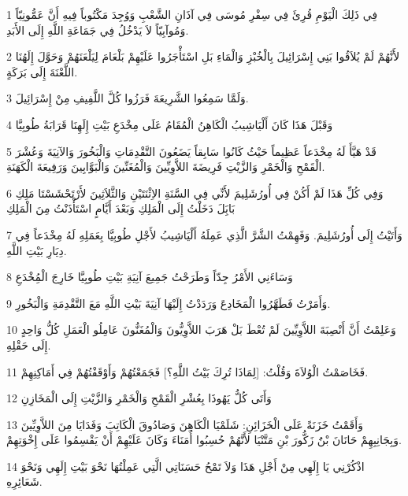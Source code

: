 \par 1 فِي ذَلِكَ الْيَوْمِ قُرِئَ فِي سِفْرِ مُوسَى فِي آذَانِ الشَّعْبِ وَوُجِدَ مَكْتُوباً فِيهِ أَنَّ عَمُّونِيّاً وَمُوآبِيّاً لاَ يَدْخُلُ فِي جَمَاعَةِ اللَّهِ إِلَى الأَبَدِ.
\par 2 لأَنَّهُمْ لَمْ يُلاَقُوا بَنِي إِسْرَائِيلَ بِالْخُبْزِ وَالْمَاءِ بَلِ اسْتَأْجَرُوا عَلَيْهِمْ بَلْعَامَ لِيَلْعَنَهُمْ وَحَوَّلَ إِلَهُنَا اللَّعْنَةَ إِلَى بَرَكَةٍ.
\par 3 وَلَمَّا سَمِعُوا الشَّرِيعَةَ فَرَزُوا كُلَّ اللَّفِيفِ مِنْ إِسْرَائِيلَ.
\par 4 وَقَبْلَ هَذَا كَانَ أَلْيَاشِيبُ الْكَاهِنُ الْمُقَامُ عَلَى مِخْدَعِ بَيْتِ إِلَهِنَا قَرَابَةُ طُوبِيَّا
\par 5 قَدْ هَيَّأَ لَهُ مِخْدَعاً عَظِيماً حَيْثُ كَانُوا سَابِقاً يَضَعُونَ التَّقْدِمَاتِ وَالْبَخُورَ وَالآنِيَةَ وَعُشْرَ الْقَمْحِ وَالْخَمْرِ وَالزَّيْتِ فَرِيضَةَ اللاَّوِيِّينَ وَالْمُغَنِّينَ وَالْبَوَّابِينَ وَرَفِيعَةَ الْكَهَنَةِ.
\par 6 وَفِي كُلِّ هَذَا لَمْ أَكُنْ فِي أُورُشَلِيمَ لأَنِّي فِي السَّنَةِ الاِثْنَتَيْنِ وَالثَّلاَثِينَ لأَرْتَحْشَسْتَا مَلِكِ بَابَِلَ دَخَلْتُ إِلَى الْمَلِكِ وَبَعْدَ أَيَّامٍ اسْتَأْذَنْتُ مِنَ الْمَلِكِ
\par 7 وَأَتَيْتُ إِلَى أُورُشَلِيمَ. وَفَهِمْتُ الشَّرَّ الَّذِي عَمِلَهُ أَلْيَاشِيبُ لأَجْلِ طُوبِيَّا بِعَمَلِهِ لَهُ مِخْدَعاً فِي دِيَارِ بَيْتِ اللَّهِ.
\par 8 وَسَاءَنِي الأَمْرُ جِدّاً وَطَرَحْتُ جَمِيعَ آنِيَةِ بَيْتِ طُوبِيَّا خَارِجَ الْمُِخْدَعِ
\par 9 وَأَمَرْتُ فَطَهَّرُوا الْمَخَادِعَ وَرَدَدْتُ إِلَيْهَا آنِيَةَ بَيْتِ اللَّهِ مَعَ التَّقْدِمَةِ وَالْبَخُورِ.
\par 10 وَعَلِمْتُ أَنَّ أَنْصِبَةَ اللاَّوِيِّينَ لَمْ تُعْطَ بَلْ هَرَبَ اللاَّوِيُّونَ وَالْمُغَنُّونَ عَامِلُو الْعَمَلِ كُلُّ وَاحِدٍ إِلَى حَقْلِهِ.
\par 11 فَخَاصَمْتُ الْوُلاَةَ وَقُلْتُ: [لِمَاذَا تُرِكَ بَيْتُ اللَّهِ؟] فَجَمَعْتُهُمْ وَأَوْقَفْتُهُمْ فِي أَمَاكِنِهِمْ.
\par 12 وَأَتَى كُلُّ يَهُوذَا بِعُشْرِ الْقَمْحِ وَالْخَمْرِ وَالزَّيْتِ إِلَى الْمَخَازِنِ
\par 13 وَأَقَمْتُ خَزَنَةً عَلَى الْخَزَائِنِ: شَلَمْيَا الْكَاهِنَ وَصَادُوقَ الْكَاتِبَ وَفَدَايَا مِنَ اللاَّوِيِّينَ وَبِجَانِبِهِمْ حَانَانَ بْنَُ زَكُّورَ بْنِ مَتَّنْيَا لأَنَّهُمْ حُسِبُوا أُمَنَاءَ وَكَانَ عَلَيْهِمْ أَنْ يَقْسِمُوا عَلَى إِخْوَتِهِمْ.
\par 14 اذْكُرْنِي يَا إِلَهِي مِنْ أَجْلِ هَذَا وَلاَ تَمْحُ حَسَنَاتِي الَّتِي عَمِلْتُهَا نَحْوَ بَيْتِ إِلَهِي وَنَحْوَ شَعَائِرِهِ.
